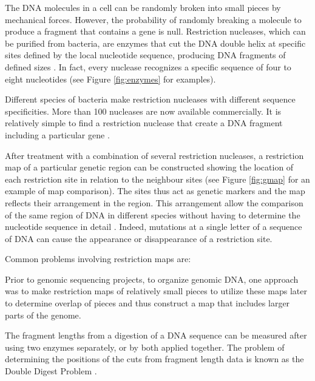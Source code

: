\label{sec:enzymes}


The DNA molecules in a cell can be randomly broken into small pieces by mechanical forces. 
However, the probability of randomly breaking a molecule to produce a fragment that contains
a gene is null. Restriction nucleases, which can be purified from bacteria, are enzymes that cut the DNA
double helix at specific sites defined by the local nucleotide sequence, producing DNA fragments of
defined sizes \citep{alberts:1994a}. In fact, every nuclease recognizes a specific sequence of four to 
eight nucleotides (see Figure \ref{fig:enzymes} for examples).

Different species of bacteria make restriction nucleases with different sequence specificities. More 
than 100 nucleases are now available commercially. It is relatively simple to find a restriction
nuclease that create a DNA fragment including a particular gene \citep{alberts:1994a}.

After treatment with a combination of several restriction nucleases, a restriction map of a particular 
 
genetic region can be constructed showing the location of each restriction site in relation to the 
neighbour sites (see Figure \ref{fig:gmap} for an example of map comparison). The sites thus act as 
genetic markers and the map reflects their arrangement in the region. This arrangement allow the comparison 
of the same region of DNA in different species without having to determine the nucleotide sequence in 
detail \citep{alberts:1994a}. Indeed, mutations at a single letter of a sequence of DNA can cause the 
appearance or disappearance of a restriction site.

\clearpage
Common problems involving restriction maps are:
\begin{mitemize}
\item
Prior to genomic sequencing projects, to organize genomic DNA, one approach was to make restriction maps
of relatively small pieces to utilize these maps later to determine overlap of pieces and thus construct
a map that includes larger parts of the genome.
\item
The fragment lengths from a digestion of a DNA sequence can be measured after using two enzymes 
separately, or by both applied together. The problem of determining the positions of the cuts from 
fragment length data is known as the Double Digest Problem \citep{schmitt:1991a}.
\end{mitemize}


